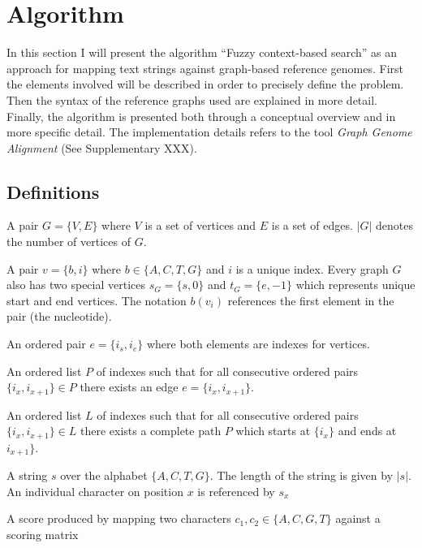 \documentclass{article}
\begin{document}
\chapter{Algorithm}
In this section I will present the algorithm ``Fuzzy context-based search'' as an approach for mapping text strings against graph-based reference genomes. First the elements involved will be described in order to precisely define the problem. Then the syntax of the reference graphs used are explained in more detail. Finally, the algorithm is presented both through a conceptual overview and in more specific detail. The implementation details refers to the tool \textit{Graph Genome Alignment} (See Supplementary XXX).
\section{Definitions}
\begin{defn}
  A pair $G=\{V,E\}$ where $V$ is a set of vertices and $E$ is a set of edges. $|G|$ denotes the number of vertices of $G$.
\end{defn}
\begin{defn}[Vertice]
  A pair $v=\{b, i\}$ where $b \in \{A, C, T, G\}$ and $i$ is a unique index. Every graph $G$ also has two special vertices $s_G=\{s, 0\}$ and $t_G=\{e, -1\}$ which represents unique start and end vertices. The notation $b(v_i)$ references the first element in the pair (the nucleotide).
\end{defn}
\begin{defn}[Edge]
  An ordered pair $e=\{i_s, i_e\}$ where both elements are indexes for vertices. 
\end{defn}
\begin{defn}
  An ordered list $P$ of indexes such that for all consecutive ordered pairs $\{i_x, i_{x+1}\} \in P$ there exists an edge $e=\{i_x, i_{x+1}\}$.
\end{defn}
\begin{defn}[Path]
  An ordered list $L$ of indexes such that for all consecutive ordered pairs $\{i_x, i_{x+1}\} \in L$ there exists a complete path $P$ which starts at $\{i_x\}$ and ends at $i_{x+1}\}$.
\end{defn}
\begin{defn}
  A string $s$ over the alphabet $\{A, C, T, G\}$. The length of the string is given by $|s|$. An individual character on position $x$ is referenced by $s_x$
\end{defn}
\begin{defn}
  A score produced by mapping two characters $c_1, c_2 \in \{A, C, G, T\}$ against a scoring matrix
\end{defn}
\end{document}
